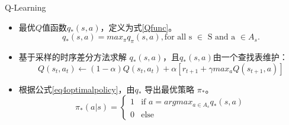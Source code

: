 \documentclass{beamer}
\begin{document}
\begin{frame}{Q-Learning}
\begin{itemize}
    \item 最优$Q$值函数$q_{*}(s, a)$，定义为式\ref{Qfunc}。
        \begin{equation}
        \label{Qfunc}
            q_{*}(s, a) = max_{\pi}q_{\pi}(s, a),
            \mbox{for all s $\in$ S and a $\in A_s$.}
        \end{equation}
    \item 基于采样的时序差分方法求解 $q_{*}(s, a)$，且$q_{*}(s, a)$由一个查找表维护：
        \begin{equation}
            Q(s_t, a_t) \leftarrow (1 - \alpha)Q(s_t, a_t) + \alpha[r_{t+1} + \gamma max_{a}Q(s_{t+1}, a)]
        \end{equation}
    
    \item 根据公式\ref{eq4optimalpolicy}，由$q_{*}$ 导出最优策略 $\pi_{*}$。
        \begin{equation}
        \pi_{*}(a|s) = \begin{cases}
        1 &\mbox{if $a = argmax_{a \in A_s}q_{*}(s, a)$}\\
        0 &\mbox{else}
        \end{cases}
        \label{eq4optimalpolicy}
        \end{equation}
\end{itemize}
\end{frame}
\end{document}
